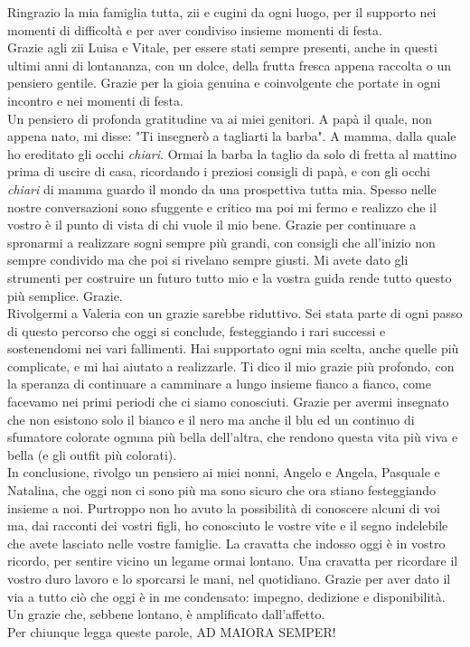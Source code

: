 Ringrazio la mia famiglia tutta, zii e cugini da ogni luogo, per il supporto nei momenti di difficoltà e per aver condiviso insieme momenti di festa.\\
Grazie agli zii Luisa e Vitale, per essere stati sempre presenti, anche in questi ultimi anni di lontananza, con un dolce, della frutta fresca appena raccolta o un pensiero gentile.
Grazie per la gioia genuina e coinvolgente che portate in ogni incontro e nei momenti di festa.\\
Un pensiero di profonda gratitudine va ai miei genitori. A papà il quale, non appena nato, mi disse: "Ti insegnerò a tagliarti la barba". A mamma, dalla quale ho ereditato gli occhi \textit{chiari}.
Ormai la barba la taglio da solo di fretta al mattino prima di uscire di casa, ricordando i preziosi consigli di papà, e con gli occhi \textit{chiari} di mamma guardo il mondo da una prospettiva tutta mia.
Spesso nelle nostre conversazioni sono sfuggente e critico ma poi mi fermo e realizzo che il vostro è il punto di vista di chi vuole il mio bene.
Grazie per continuare a spronarmi a realizzare sogni sempre più grandi, con consigli che all'inizio non sempre condivido ma che poi si rivelano sempre giusti.
Mi avete dato gli strumenti per costruire un futuro tutto mio e la vostra guida rende tutto questo più semplice. Grazie.\\
Rivolgermi a Valeria con un grazie sarebbe riduttivo.
Sei stata parte di ogni passo di questo percorso che oggi si conclude, festeggiando i rari successi e sostenendomi nei vari fallimenti.
Hai supportato ogni mia scelta, anche quelle più complicate, e mi hai aiutato a realizzarle.
Ti dico il mio grazie più profondo, con la speranza di continuare a camminare a lungo insieme fianco a fianco, come facevamo nei primi periodi che ci siamo conosciuti.
Grazie per avermi insegnato che non esistono solo il bianco e il nero ma anche il blu ed un continuo di sfumatore colorate ognuna più bella dell'altra, che rendono questa vita più viva e bella (e gli outfit più colorati).\\
In conclusione, rivolgo un pensiero ai miei nonni, Angelo e Angela, Pasquale e Natalina, che oggi non ci sono più ma sono sicuro che ora stiano festeggiando insieme a noi.
Purtroppo non ho avuto la possibilità di conoscere alcuni di voi ma, dai racconti dei vostri figli, ho conosciuto le vostre vite e il segno indelebile che avete lasciato nelle vostre famiglie.
La cravatta che indosso oggi è in vostro ricordo, per sentire vicino un legame ormai lontano. Una cravatta per ricordare il vostro duro lavoro e lo sporcarsi le mani, nel quotidiano. 
Grazie per aver dato il via a tutto ciò che oggi è in me condensato: impegno, dedizione e disponibilità. Un grazie che, sebbene lontano, è amplificato dall'affetto.\\

\noindent Per chiunque legga queste parole, AD MAIORA SEMPER!


